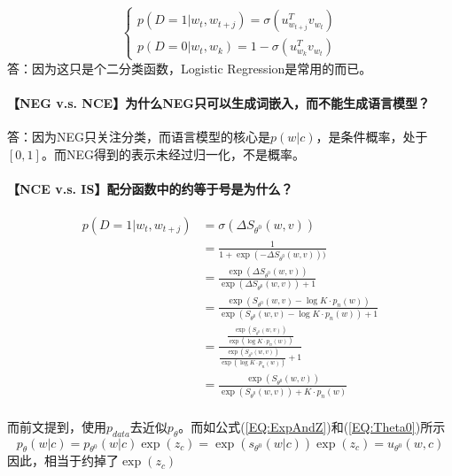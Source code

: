 \documentclass{article}
\begin{document}
\begin{equation}
    \begin{cases}
        p(D=1|w_t, w_{t+j}) = \sigma(u^T_{w_{t+j}} v_{w_t})\\
        p(D=0|w_t, w_k) = 1-\sigma(u^T_{w_k} v_{w_t})
    \end{cases}
\end{equation}
答：因为这只是个二分类函数，Logistic Regression是常用的而已。

\paragraph{【NEG v.s. NCE】为什么NEG只可以生成词嵌入，而不能生成语言模型？}

答：因为NEG只关注分类，而语言模型的核心是$p(w|c)$，是条件概率，处于$\left[0,1\right]$。而NEG得到的表示未经过归一化，不是概率。

\paragraph{【NCE v.s. IS】配分函数中的约等于号是为什么？}

\begin{equation}
    \begin{split}
        p(D=1|w_t, w_{t+j}) &= \sigma(\Delta S_{\theta^0}(w,v))\\
        &= \frac{1}{1+\exp (- \Delta S_{\theta^0} (w,v)))} \\
        &= \frac{\exp (\Delta S_{\theta^0} (w,v))}{\exp (\Delta S_{\theta^0} (w,v)) + 1} \\
        &= \frac{\exp(S_{\theta^0}(w,v) - \log K \cdot p_n(w))}{\exp(S_{\theta^0}(w,v) - \log K \cdot p_n(w)) + 1} \\
        &= \frac{ \frac{\exp(S_{\theta^0}(w,v))}{\exp (\log K \cdot p_n(w) )} }{\frac{\exp(S_{\theta^0}(w,v))}{\exp (\log K \cdot p_n(w) )}+1} \\
        &= \frac{\exp(S_{\theta^0}(w,v))}{\exp(S_{\theta^0}(w,v))+K\cdot p_n(w)}\\
    \end{split}
\end{equation}

而前文提到，使用$p_{data}$去近似$p_\theta$。而如公式(\ref{EQ:ExpAndZ})和(\ref{EQ:Theta0})所示
\begin{equation}
    p_\theta(w|c) = p_{\theta^0}(w|c)\exp (z_c) = \exp(s_{\theta^0}(w|c))\exp (z_c) = u_{\theta^0}(w,c)
\end{equation}
因此，相当于约掉了$\exp(z_c)$




\end{document}
